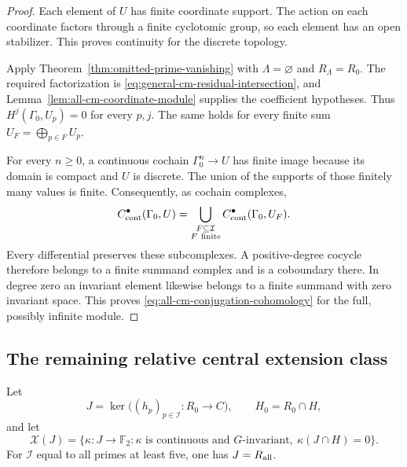 \begin{proof}
Each element of \(U\) has finite coordinate support.
The action on each coordinate factors through a finite
cyclotomic group, so each element has an open stabilizer.
This proves continuity for the discrete topology.

Apply Theorem~\ref{thm:omitted-prime-vanishing} with
\(\Lambda=\varnothing\) and \(R_\Lambda=R_0\).
The required factorization is
\eqref{eq:general-cm-residual-intersection}, and
Lemma~\ref{lem:all-cm-coordinate-module} supplies the
coefficient hypotheses. Thus
\(H^j(\Gamma_0,U_p)=0\) for every \(p,j\).
The same holds for every finite sum
\(U_F=\bigoplus_{p\in F}U_p\).

For every \(n\ge0\), a continuous cochain
\(\Gamma_0^n\to U\) has finite image because its domain
is compact and \(U\) is discrete.
The union of the supports of those finitely many values
is finite. Consequently, as cochain complexes,
\begin{equation}
 C^\bullet_{\rm cont}(\Gamma_0,U)
      =\bigcup_{\substack{F\subseteq\mathcal I\\F\ {\rm finite}}}
                            C^\bullet_{\rm cont}(\Gamma_0,U_F).
 \label{eq:all-cm-continuous-cochain-union}
\end{equation}
Every differential preserves these subcomplexes.
A positive-degree cocycle therefore belongs to a finite
summand complex and is a coboundary there.
In degree zero an invariant element likewise belongs
to a finite summand with zero invariant space.
This proves \eqref{eq:all-cm-conjugation-cohomology}
for the full, possibly infinite module.
\end{proof}

\subsection{The remaining relative central extension class}

Let
\[
 J=\ker\bigl((h_p)_{p\in\mathcal I}:R_0\to C\bigr),\qquad
 H_0=R_0\cap H,
\]
and let
\[
 \mathscr X(J)=
 \{\kappa:J\to\mathbb F_2:
   \kappa\text{ is continuous and }G\text{-invariant},\
   \kappa(J\cap H)=0\}.
\]
For \(\mathcal I\) equal to all primes at least five,
one has \(J=R_{\rm all}\).


